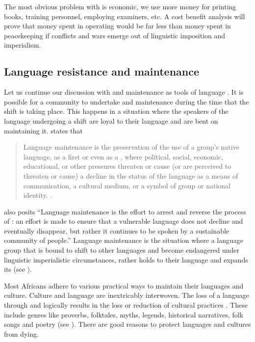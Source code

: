 \documentclass[output=paper,
modfonts
]{langscibook}
\begin{document}
The most obvious problem with  is economic, we use more money for printing books, training personnel, employing examiners, etc. A cost benefit analysis will prove that money spent in operating  would be far less than money spent in peacekeeping if conflicts and wars emerge out of linguistic imposition and imperialism.

\subsection{Language resistance and maintenance}
\largerpage
Let us continue our discussion with  and maintenance as tools of language . It is possible for a community to undertake  and maintenance during the time that the shift is taking place. This happens in a situation where the speakers of the language undergoing a shift are loyal to their language and are bent on maintaining it. \citet{Nahir2003} states that 

\begin{quote}
Language maintenance is the preservation of the use of a group’s native language, as a first or even as a , where political, social, economic, educational, or other pressures threaten or cause (or are perceived to threaten or cause) a decline in the status of the language as a means of communication, a cultural medium, or a symbol of group or national identity. \citep[439]{Nahir2003}.
\end{quote}

\citet[673]{Lewis2013} also posits “Language maintenance is the effort to arrest and reverse the process of : an effort is made to ensure that a vulnerable language does not decline and eventually disappear, but rather it continues to be spoken by a sustainable community of people.” Language maintenance is the situation where a language group that is bound to shift to other languages and become endangered under linguistic imperialistic circumstances, rather holds to their language and expands its  (see \citealt[157]{Coulmas2005}). 

Most Africans adhere to various practical ways to maintain their languages and culture. Culture and language are inextricably interwoven. The loss of a language through  and  logically results in the loss or reduction of cultural practices \citep[153]{Derhemi2002b}. These include  genres like proverbs, folktales, myths, legends, historical narratives, folk songs and poetry (see \citealt{Crystal2000}). There are good reasons to protect languages and cultures from dying. 
\end{document}
